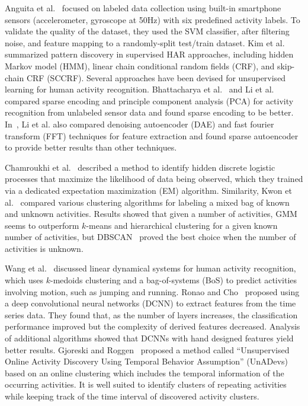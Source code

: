 Anguita et al.~\cite{anguita2013} focused on labeled data collection using built-in smartphone sensors (accelerometer, gyroscope at 50Hz) with six predefined activity labels. To validate the quality of the dataset, they used the SVM classifier, after filtering noise, and feature mapping to a randomly-split test/train dataset. Kim et al.~\cite{kim2010} summarized pattern discovery in supervised HAR approaches, including hidden Markov model (HMM), linear chain conditional random fields (CRF), and skip-chain CRF (SCCRF).
Several approaches have been devised for unsupervised learning for human activity recognition. Bhattacharya et al.~\cite{bhattacharya2014} and Li et al.~\cite{yongmou2014} compared sparse encoding and principle component analysis (PCA) for activity recognition from unlabeled sensor data and found sparse encoding to be better. In~\cite{yongmou2014}, Li et al. also compared denoising autoencoder (DAE) and fast fourier transform (FFT) techniques for feature extraction and found sparse autoencoder to provide better results than other techniques.

Chamroukhi et al.~\cite{chamroukhi2013} described a method to identify hidden discrete logistic processes that maximize the likelihood of data being observed, which they trained via a dedicated expectation maximization (EM) algorithm. Similarity, Kwon et al.~\cite{kwon2014} compared various clustering algorithms for labeling a mixed bag of known and unknown activities. Results showed that given a number of activities, GMM seems to outperform $k$-means and hierarchical clustering for a given known number of activities, but DBSCAN~\cite{ester1996} proved the best choice when the number of activities is unknown.

Wang et al.~\cite{wang2014} discussed linear dynamical systems for human activity recognition, which uses $k$-medoids clustering and a bag-of-systems (BoS) to predict activities involving motion, such as jumping and running. Ronao and Cho~\cite{ronao2015} proposed using a deep convolutional neural networks (DCNN) to extract features from the time series data. They found that, as the number of layers increases, the classification performance improved but the complexity of derived features decreased. Analysis of additional algorithms showed that DCNNs with hand designed features yield better results. Gjoreski and Roggen~\cite{gjoreski2017} proposed a method called ``Unsupervised Online Activity Discovery Using Temporal Behavior Assumption'' (UnADevs) based on an online clustering which includes the temporal information of the occurring activities. It is well suited to identify clusters of repeating activities while keeping track of the time interval of discovered activity clusters.


